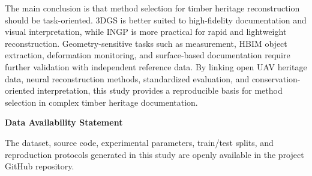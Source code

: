 The main conclusion is that method selection for timber heritage
reconstruction should be task-oriented. 3DGS is better suited to
high-fidelity documentation and visual interpretation, while INGP is
more practical for rapid and lightweight reconstruction.
Geometry-sensitive tasks such as measurement, HBIM object extraction,
deformation monitoring, and surface-based documentation require further
validation with independent reference data. By linking open UAV heritage
data, neural reconstruction methods, standardized evaluation, and
conservation-oriented interpretation, this study provides a reproducible
basis for method selection in complex timber heritage documentation.

\textbf{Data Availability Statement}

The dataset, source code, experimental parameters, train/test
splits, and reproduction protocols generated in this study are openly
available in the project GitHub repository.
